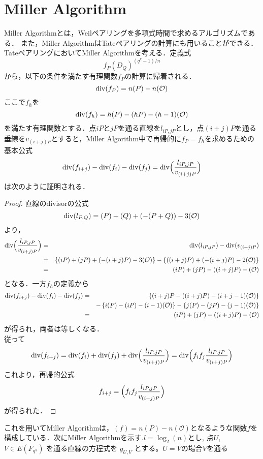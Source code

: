 \section{Miller Algorithm}
\par
Miller Algorithm\cite{MIA}とは，Weilペアリングを多項式時間で求めるアルゴリズムである．
また，Miller AlgorithmはTateペアリングの計算にも用いることができる．TateペアリングにおいてMiller Algorithmを考える．定義式
\[
f_P(D_Q)^{{(q^k-1)}/n}
\]
から，以下の条件を満たす有理関数$f_P$の計算に帰着される．
\[
{\rm div}(f_P)=n(P)-n(\mathcal{O})
\]
ここで$f_h$を
\[
{\rm div}(f_h)=h(P)-(hP)-(h-1)(\mathcal{O})
\]
を満たす有理関数とする．点$iP$と$jP$を通る直線を$l_{iP,jP}$とし，点$(i+j)P$を通る垂線を$v_{(i+j)P}$とすると，Miller Algorithm中で再帰的に$f_P=f_h$を求めるための基本公式
\[
{\rm div}(f_{i+j})-{\rm div}(f_i)-{\rm div}(f_j)={\rm div}\Bigl(\frac{l_{iP,jP}}{v_{(i+j)P}}\Bigr)
\]
は次のように証明される．
\begin{proof}
直線のdivisorの公式
\[
{\rm div}(l_{P,Q})=(P)+(Q)+(-(P+Q))-3(\mathcal{O})
\]
より，
\begin{eqnarray*}
{\rm div}\Bigl(\frac{l_{iP,jP}}{v_{(i+j)P}}\Bigr)&=&{\rm div}(l_{iP,jP})-{\rm div}(v_{(i+j)P})\\
&=&\left\{(iP)+(jP)+(-(i+j)P)-3(\mathcal{O})\right\}-\left\{((i+j)P)+(-(i+j)P)-2(\mathcal{O})\right\}\\
&=&(iP)+(jP)-((i+j)P)-(\mathcal{O})
\end{eqnarray*}となる．一方$f_h$の定義から
\begin{eqnarray*}
{\rm div}(f_{i+j})-{\rm div}(f_i)-{\rm div}(f_j)&=&\left\{(i+j)P-((i+j)P)-(i+j-1)(\mathcal{O})\right\}\\
&\ \ \ &-\left\{i(P)-(iP)-(i-1)(\mathcal{O})\right\}-\left\{j(P)-(jP)-(j-1)(\mathcal{O})\right\}\\
&=&(iP)+(jP)-((i+j)P)-(\mathcal{O})
\end{eqnarray*}が得られ，両者は等しくなる．\\
従って
\[
{\rm div}(f_{i+j})={\rm div}(f_i)+{\rm div}(f_j)+{\rm div}\Bigl(\frac{l_{iP,jP}}{v_{(i+j)P}}\Bigr)={\rm div}\Bigl(f_if_j\frac{l_{iP,jP}}{v_{(i+j)P}}\Bigr)
\]
これより，再帰的公式
\[
f_{i+j}=\Bigl(f_if_j\frac{l_{iP,jP}}{v_{(i+j)P}}\Bigr)
\]が得られた．
\end{proof}
これを用いてMiller Algorithmは，$(f) = n(P) - n(\mathcal{O})$となるような関数$f$を構成している．次にMiller Algorithmを示す.$l= \log _2 (n)$とし, 点$U$, $V ∈ E(F_{q^k})$ を通る直線の方程式を $g_{U,V}$ とする。$U=V$の場合$V$を通る \\

